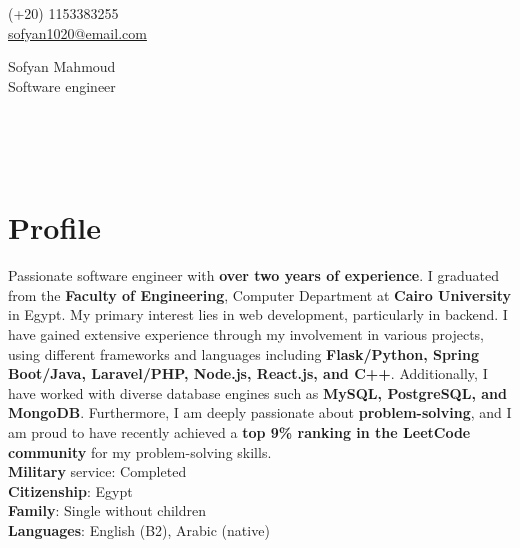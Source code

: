 \documentclass[a4,10pt]{article}
\begin{document}
\begin{center}
    \begin{minipage}[b]{0.24\textwidth}
            \large (+20) 1153383255 \\
            \large \href{mailto:sofyan1020@email.com}{sofyan1020@email.com} 
    \end{minipage}%
    \begin{minipage}[b]{0.5\textwidth}
            \centering
            {\Huge Sofyan Mahmoud} \\ %
            \vspace{0.1cm}
            {\color{UI_blue} \Large{Software engineer}} \\
    \end{minipage}%
    \begin{minipage}[b]{0.24\textwidth}
            \flushright \large  %
            \href{https://www.linkedin.com/in/sofyanmahmoud0000/}{\color{blue}{LinkedIn} } \\
            \href{https://leetcode.com/u/sofyan1020/}{\color{blue}{Leetcode}} \\ 
            \href{https://github.com/sofyanmahmoud0000}{\color{blue}{Github}} \\ 
    \end{minipage}   
    
\vspace{-0.15cm} 
\end{center}
\vspace{-0.25cm}

\section{Profile }
Passionate software engineer with \textbf{over two years of experience}. I graduated from the \textbf{Faculty of Engineering}, 
Computer Department at \textbf{Cairo University} in Egypt. My primary interest lies in web development, 
particularly in backend. I have gained extensive experience through my involvement in various projects, 
using different frameworks and languages including \textbf{Flask/Python, Spring Boot/Java, 
Laravel/PHP, Node.js, React.js, and C++}. Additionally, I have worked with diverse database engines such as \textbf{MySQL, 
PostgreSQL, and MongoDB}. Furthermore, I am deeply passionate about \textbf{problem-solving}, 
and I am proud to have recently achieved a \textbf{top 9\% ranking in the LeetCode community} for my problem-solving skills. \\
\hfill \break
\textbf{Military} service: Completed \\
\textbf{Citizenship}: Egypt \\ 
\textbf{Family}: Single without children \\
\textbf{Languages}: English (B2), Arabic (native) \\
\end{document}

